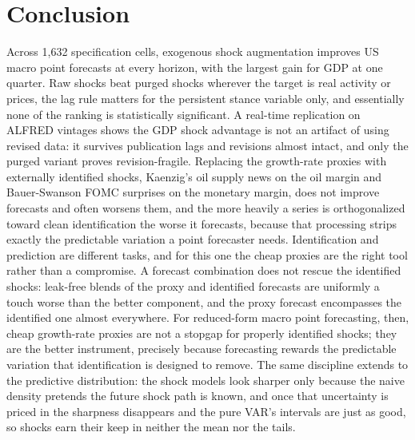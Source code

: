 \documentclass[conference]{IEEEtran}
\begin{document}
\section{Conclusion}
Across 1{,}632 specification cells, exogenous shock augmentation improves US macro point forecasts at every horizon, with the largest gain for GDP at one quarter. Raw shocks beat purged shocks wherever the target is real activity or prices, the lag rule matters for the persistent stance variable only, and essentially none of the ranking is statistically significant. A real-time replication on ALFRED vintages shows the GDP shock advantage is not an artifact of using revised data: it survives publication lags and revisions almost intact, and only the purged variant proves revision-fragile. Replacing the growth-rate proxies with externally identified shocks, Kaenzig's oil supply news on the oil margin and Bauer-Swanson FOMC surprises on the monetary margin, does not improve forecasts and often worsens them, and the more heavily a series is orthogonalized toward clean identification the worse it forecasts, because that processing strips exactly the predictable variation a point forecaster needs. Identification and prediction are different tasks, and for this one the cheap proxies are the right tool rather than a compromise. A forecast combination does not rescue the identified shocks: leak-free blends of the proxy and identified forecasts are uniformly a touch worse than the better component, and the proxy forecast encompasses the identified one almost everywhere. For reduced-form macro point forecasting, then, cheap growth-rate proxies are not a stopgap for properly identified shocks; they are the better instrument, precisely because forecasting rewards the predictable variation that identification is designed to remove. The same discipline extends to the predictive distribution: the shock models look sharper only because the naive density pretends the future shock path is known, and once that uncertainty is priced in the sharpness disappears and the pure VAR's intervals are just as good, so shocks earn their keep in neither the mean nor the tails.
\end{document}

